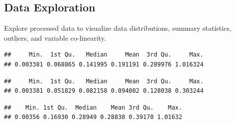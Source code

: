 \documentclass[
]{article}
\newenvironment{Shaded}{\begin{snugshade}}{\end{snugshade}}
\newcommand{\CommentTok}[1]{\textcolor[rgb]{0.56,0.35,0.01}{\textit{#1}}}
\newcommand{\FunctionTok}[1]{\textcolor[rgb]{0.13,0.29,0.53}{\textbf{#1}}}
\newcommand{\NormalTok}[1]{#1}
\newcommand{\SpecialCharTok}[1]{\textcolor[rgb]{0.81,0.36,0.00}{\textbf{#1}}}
\begin{document}
\hypertarget{data-exploration}{%
\subsection{Data Exploration}\label{data-exploration}}

Explore processed data to visualize data distributions, summary
statistics, outliers, and variable co-linearity.

\begin{Shaded}
\end{Shaded}

\begin{verbatim}
##     Min.  1st Qu.   Median     Mean  3rd Qu.     Max. 
## 0.003381 0.068865 0.141995 0.191191 0.289976 1.016324
\end{verbatim}

\begin{Shaded}
\end{Shaded}

\begin{verbatim}
##     Min.  1st Qu.   Median     Mean  3rd Qu.     Max. 
## 0.003381 0.051829 0.082158 0.094002 0.128038 0.303244
\end{verbatim}

\begin{Shaded}
\end{Shaded}

\begin{verbatim}
##    Min. 1st Qu.  Median    Mean 3rd Qu.    Max. 
## 0.00356 0.16930 0.28949 0.28838 0.39170 1.01632
\end{verbatim}

\begin{Shaded}
\end{Shaded}
\end{document}
